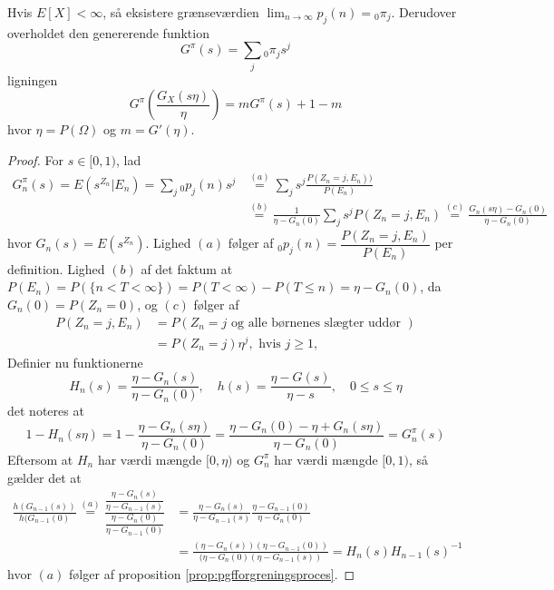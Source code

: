 \begin{lem}
Hvis $E[X] < \infty$, så eksistere grænseværdien $\lim_{n \to \infty} p_j (n) = {}_0\pi_j$. Derudover overholdet den genererende funktion
\begin{equation*}
    G^\pi(s) = \sum_j {}_0 \pi_j s^j
\end{equation*}
ligningen 
\begin{equation} \label{alg:alg6.7.2grim}
    G^\pi\left(\frac{G_X(s\eta)}{\eta}\right) = m G^\pi(s) + 1 - m
\end{equation}
hvor $\eta = P(\Omega)$ og $m = G'(\eta)$.
\end{lem}
\begin{proof}
For $s \in [0, 1)$, lad
\begin{align*}
    G_n^\pi (s) = E(s^{Z_n} | E_n) = \sum_j {}_0p_j(n)s^j &\stackrel{(a)}= \sum_j s^j \frac{P(Z_n = j, E_n))}{P(E_n)} \\ 
    &\stackrel{(b)} = \frac{1}{\eta - G_n(0)} \sum_j s^j P(Z_n = j, E_n) \stackrel{(c)} = \frac{G_n(s\eta) - G_n(0)}{\eta - G_n(0)}
\end{align*}
hvor $G_n(s) = E(s^{Z_n})$. Lighed $(a)$ følger af ${}_0p_j(n) = \dfrac{P(Z_n = j, E_n)}{P(E_n)}$ per definition. Lighed $(b)$ af det faktum at $P(E_n) = P(\{n < T < \infty\}) = P(T < \infty) - P(T \leq n) = \eta - G_n(0)$, da $G_n(0) = P(Z_n = 0)$, og $(c)$ følger af
\begin{align*}
    P(Z_n = j, E_n) &= P(Z_n = j \text{ og alle børnenes slægter uddør }) \\
    &= P(Z_n = j) \eta^j, \text{ hvis } j \geq 1,
\end{align*}
Definier nu funktionerne 
\begin{equation*}
    H_n(s) = \frac{\eta - G_n(s)}{\eta - G_n(0)}, \quad h(s) = \frac{\eta - G(s)}{\eta - s}, \quad 0 \leq s \leq \eta
\end{equation*}
det noteres at 
\begin{equation*} \label{eq:lemmaErAids}
    1 - H_n(s \eta) = 1 - \frac{\eta - G_n(s\eta)}{\eta - G_n(0)} = \frac{\eta - G_n(0) - \eta + G_n(s\eta)}{\eta - G_n(0)} = G_n^\pi(s)
\end{equation*}
Eftersom at $H_n$ har værdi mængde $[0, \eta)$ og $G_n^\pi$ har værdi mængde $[0, 1)$, så gælder det at 
\begin{align*}
    \frac{h(G_{n - 1}(s))}{h(G_{n - 1}(0)} \stackrel{(a)}=
    \frac{\dfrac{\eta - G_{n}(s)}{\eta - G_{n - 1}(s)}}{\dfrac{\eta - G_{n}(0)}{\eta - G_{n - 1}(0)}} &= 
    \frac{\eta - G_{n}(s)}{\eta - G_{n - 1}(s)}\frac{\eta - G_{n-1}(0)}{\eta - G_{n}(0)} \\
    &= 
    \frac{(\eta - G_{n}(s))(\eta -  G_{n - 1}(0))}{(\eta - G_n(0)(\eta - G_{n - 1}(s))}
    =
    H_n(s)H_{n - 1}(s)^{-1}
\end{align*}
hvor $(a)$ følger af proposition \ref{prop:pgfforgreningsproces}. 


\end{proof}
